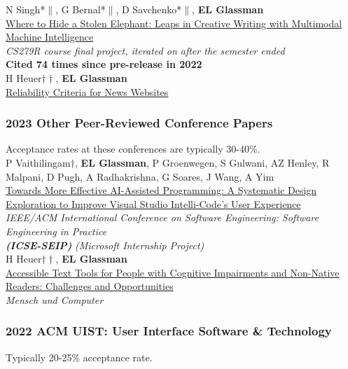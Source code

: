 \documentclass[10pt, a4paper]{article}
\newcommand{\years}[1]{\marginnote{\normalsize #1}}
\begin{document}
\years{\textbf{J4}}N Singh*$\|$, G Bernal*$\|$, D Savchenko*$\|$, \textbf{EL Glassman}\\
\href{http://glassmanlab.seas.harvard.edu/papers/elephant_tochi2022.pdf}{Where to Hide a Stolen Elephant: Leaps in Creative Writing with Multimodal Machine Intelligence}\\
\textit{CS279R course final project, iterated on after the semester ended}\\
\textbf{Cited 74 times since pre-release in 2022}\\[0.2cm]
\years{\textbf{J3}}H Heuer$\dagger\dagger$, \textbf{EL Glassman}\\
\href{http://glassmanlab.seas.harvard.edu/papers/reliability_criteria.pdf}{Reliability Criteria for News Websites}


\subsubsection*{2023 Other Peer-Reviewed Conference Papers}
Acceptance rates at these conferences are typically 30-40\%.\\

\years{\textbf{C28}}P Vaithilingam$\dagger$, \textbf{EL Glassman}, P Groenwegen, S Gulwani, AZ Henley, R Malpani, D Pugh, A Radhakrishna, G Soares, J Wang, A Yim\\ \href{http://glassmanlab.seas.harvard.edu/papers/Vaithilingam2023ICSE_IntelliCode.pdf}{Towards More Effective AI-Assisted Programming: A Systematic Design Exploration to Improve Visual Studio Intelli-Code’s User Experience}\\
\emph{IEEE/ACM International Conference on Software Engineering: Software Engineering in Practice\\
\textbf{(ICSE-SEIP)}} \textit{(Microsoft Internship Project)}\\[0.2cm]
\years{\textbf{C27}}H Heuer$\dagger\dagger$, \textbf{EL Glassman}\\
\href{http://glassmanlab.seas.harvard.edu/papers/accessible_text_tools_MuC23.pdf}{Accessible Text Tools for People with Cognitive Impairments and Non-Native Readers: Challenges and Opportunities}\\
\emph{Mensch und Computer}

\subsubsection*{2022 ACM \textbf{UIST}: User Interface Software \& Technology }
Typically 20-25\% acceptance rate.\\
\end{document}
